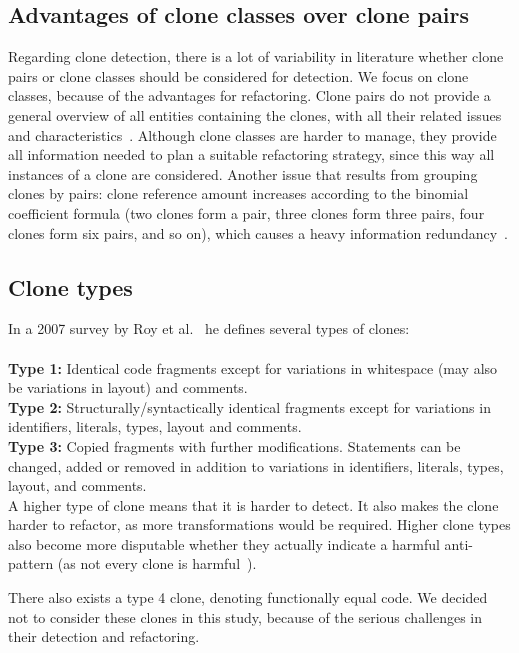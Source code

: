 \documentclass[a4paper]{article}
\begin{document}
\subsection{Advantages of clone classes over clone pairs}\label{chap:cloneclasses}
Regarding clone detection, there is a lot of variability in literature whether clone pairs or clone classes should be considered for detection. We focus on clone classes, because of the advantages for refactoring. Clone pairs do not provide a general overview of all entities containing the clones, with all their related issues and characteristics~\cite{fontana2012duplicated}. Although clone classes are harder to manage, they provide all information needed to plan a suitable refactoring strategy, since this way all instances of a clone are considered. Another issue that results from grouping clones by pairs: clone reference amount increases according to the binomial coefficient formula (two clones form a pair, three clones form three pairs, four clones form six pairs, and so on), which causes a heavy information redundancy~\cite{fontana2012duplicated}.

\subsection{Clone types}\label{chap:backgroundclonetypes}
In a 2007 survey by Roy et al.~\cite{roy2007survey} he defines several types of clones:
\\\\
\textbf{Type 1:} Identical code fragments except for variations in whitespace (may also be variations in layout) and comments.\\
\textbf{Type 2:} Structurally/syntactically identical fragments except for variations in identifiers, literals, types, layout and comments.\\
\textbf{Type 3:} Copied fragments with further modifications. Statements can be changed, added or removed in addition to variations in identifiers, literals, types, layout, and comments.\\

A higher type of clone means that it is harder to detect. It also makes the clone harder to refactor, as more transformations would be required. Higher clone types also become more disputable whether they actually indicate a harmful anti-pattern (as not every clone is harmful~\cite{jarzabek2010clones, kapser2008cloning}).

There also exists a type 4 clone, denoting functionally equal code. We decided not to consider these clones in this study, because of the serious challenges in their detection and refactoring.
\end{document}
